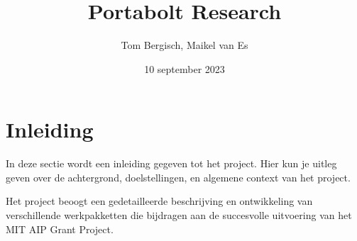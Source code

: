 \documentclass{article}
\title{Portabolt Research} %
\author{Tom Bergisch, Maikel van Es} %
\date{10 september 2023} %
\begin{document}
\maketitle %

\tableofcontents %
\newpage %

\section{Inleiding}
In deze sectie wordt een inleiding gegeven tot het project. Hier kun je uitleg geven over de achtergrond, doelstellingen, en algemene context van het project.

Het project beoogt een gedetailleerde beschrijving en ontwikkeling van verschillende werkpakketten die bijdragen aan de succesvolle uitvoering van het MIT AIP Grant Project.

\end{document}
